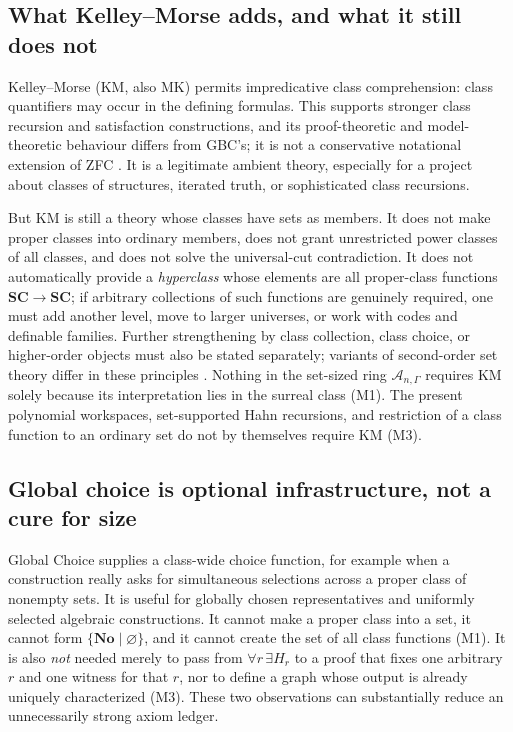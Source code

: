 \documentclass[11pt,letterpaper]{article}
\numberwithin{equation}{section}
\theoremstyle{definition}
\theoremstyle{remark}
\newcommand{\No}{\mathbf{No}}
\newcommand{\SC}{\mathbf{SC}}
\newcommand{\Ag}{\mathscr A}
\begin{document}
\subsection{What Kelley--Morse adds, and what it still does not}
\label{found:sub:km}
Kelley--Morse (KM, also MK) permits impredicative class comprehension: class
quantifiers may occur in the defining formulas. This supports stronger class
recursion and satisfaction constructions, and its proof-theoretic and
model-theoretic behaviour differs from GBC's; it is not a conservative
notational extension of ZFC \cite{found:Williams,found:ClassForcing}. It is a
legitimate ambient theory, especially for a project about classes of
structures, iterated truth, or sophisticated class recursions.

But KM is still a theory whose classes have sets as members. It does not make
proper classes into ordinary members, does not grant unrestricted power classes
of all classes, and does not solve the universal-cut contradiction. It does not
automatically provide a \emph{hyperclass} whose elements are all proper-class
functions $\SC\to\SC$; if arbitrary collections of such functions are genuinely
required, one must add another level, move to larger universes, or work with
codes and definable families. Further strengthening by class collection, class
choice, or higher-order objects must also be stated separately; variants of
second-order set theory differ in these principles \cite{found:Williams}.
Nothing in the set-sized ring $\Ag_{n,\Gamma}$ requires KM solely because its
interpretation lies in the surreal class (M1). The present polynomial
workspaces, set-supported Hahn recursions, and restriction of a class function
to an ordinary set do not by themselves require KM (M3).

\subsection{Global choice is optional infrastructure, not a cure for size}
\label{found:sub:globalchoice}
Global Choice supplies a class-wide choice function, for example when a
construction really asks for simultaneous selections across a proper class of
nonempty sets. It is useful for globally chosen representatives and uniformly
selected algebraic constructions. It cannot make a proper class into a set, it
cannot form $\{\No\mid\varnothing\}$, and it cannot create the set of all class
functions (M1). It is also \emph{not} needed merely to pass from
$\forall r\,\exists H_r$ to a proof that fixes one arbitrary $r$ and one witness
for that $r$, nor to define a graph whose output is already uniquely
characterized (M3). These two observations can substantially reduce an
unnecessarily strong axiom ledger.
\end{document}

